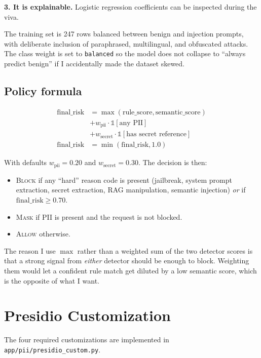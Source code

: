 \documentclass[conference]{IEEEtran}
\begin{document}
\textbf{3. It is explainable.} Logistic regression coefficients can be
inspected during the viva.

The training set is 247 rows balanced between benign and injection
prompts, with deliberate inclusion of paraphrased, multilingual, and
obfuscated attacks. The class weight is set to \texttt{balanced} so the
model does not collapse to ``always predict benign'' if I accidentally
made the dataset skewed.

\subsection{Policy formula}
\begin{align}
\textrm{final\_risk} &= \max(\textrm{rule\_score}, \textrm{semantic\_score}) \nonumber \\
                    &+ w_{\textrm{pii}} \cdot \mathbb{1}[\textrm{any PII}] \nonumber \\
                    &+ w_{\textrm{secret}} \cdot \mathbb{1}[\textrm{has secret reference}] \nonumber \\
\textrm{final\_risk} &= \min(\textrm{final\_risk}, 1.0)
\end{align}

With defaults $w_{\textrm{pii}}=0.20$ and $w_{\textrm{secret}}=0.30$.
The decision is then:
\begin{itemize}
\item \textsc{Block} if any ``hard'' reason code is present (jailbreak,
  system prompt extraction, secret extraction, RAG manipulation,
  semantic injection) \emph{or} if $\textrm{final\_risk} \geq 0.70$.
\item \textsc{Mask} if PII is present and the request is not blocked.
\item \textsc{Allow} otherwise.
\end{itemize}

The reason I use $\max$ rather than a weighted sum of the two detector
scores is that a strong signal from \emph{either} detector should be
enough to block. Weighting them would let a confident rule match get
diluted by a low semantic score, which is the opposite of what I want.

\section{Presidio Customization}

The four required customizations are implemented in
\texttt{app/pii/presidio\_custom.py}.
\end{document}
